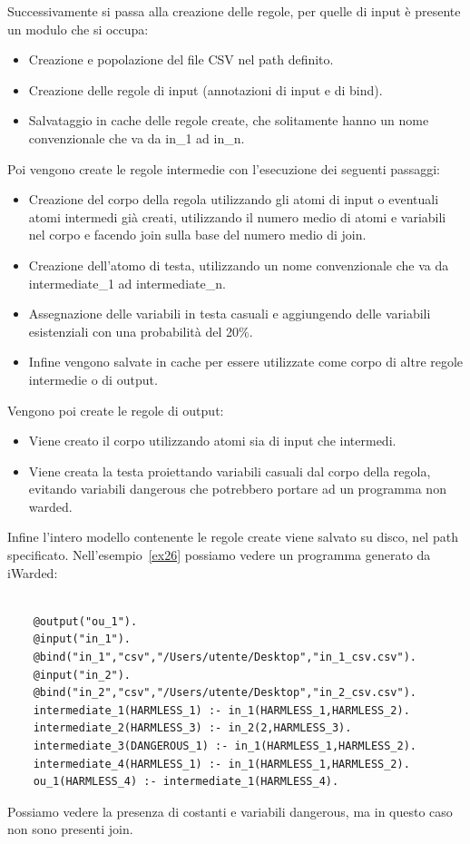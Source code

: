 Successivamente si passa alla creazione delle regole, per quelle di input è presente un modulo che si occupa:
\begin{itemize}
	\item Creazione e popolazione del file CSV nel path definito.
	\item Creazione delle regole di input (annotazioni di input e di bind).
	\item Salvataggio in cache delle regole create, che solitamente hanno un nome convenzionale che va da in\_1 ad in\_n.
\end{itemize}
Poi vengono create le regole intermedie con l'esecuzione dei seguenti passaggi:
\begin{itemize}
	\item Creazione del corpo della regola utilizzando gli atomi di input o eventuali atomi intermedi già creati, utilizzando il numero medio di atomi e variabili nel corpo e facendo join sulla base del numero medio di join.
	\item Creazione dell'atomo di testa, utilizzando un nome convenzionale che va da intermediate\_1 ad intermediate\_n.
	\item Assegnazione delle variabili in testa casuali e aggiungendo delle variabili esistenziali con una probabilità del 20\%.
	\item Infine vengono salvate in cache per essere utilizzate come corpo di altre regole intermedie o di output.
\end{itemize}
Vengono poi create le regole di output:
\begin{itemize}
	\item Viene creato il corpo utilizzando atomi sia di input che intermedi.
	\item Viene creata la testa proiettando variabili casuali dal corpo della regola, evitando variabili dangerous che potrebbero portare ad un programma non warded.
\end{itemize}
Infine l'intero modello contenente le regole create viene salvato su disco, nel path specificato. \newline
Nell'esempio~\ref{ex26} possiamo vedere un programma generato da iWarded:
\begin{example}\label{ex26}
	\scriptsize \begin{lstlisting}
	
	@output("ou_1").
	@input("in_1").
	@bind("in_1","csv","/Users/utente/Desktop","in_1_csv.csv").
	@input("in_2").
	@bind("in_2","csv","/Users/utente/Desktop","in_2_csv.csv").
	intermediate_1(HARMLESS_1) :- in_1(HARMLESS_1,HARMLESS_2).
	intermediate_2(HARMLESS_3) :- in_2(2,HARMLESS_3).
	intermediate_3(DANGEROUS_1) :- in_1(HARMLESS_1,HARMLESS_2).
	intermediate_4(HARMLESS_1) :- in_1(HARMLESS_1,HARMLESS_2).
	ou_1(HARMLESS_4) :- intermediate_1(HARMLESS_4).
	\end{lstlisting}
\end{example}
Possiamo vedere la presenza di costanti e variabili dangerous, ma in questo caso non sono presenti join. 

